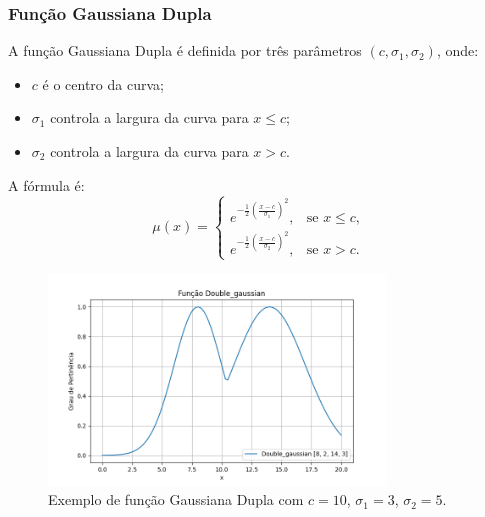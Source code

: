 \documentclass[a4paper,12pt]{article}
\begin{document}
\subsubsection{Função Gaussiana Dupla}
A função Gaussiana Dupla é definida por três parâmetros $(c, \sigma_1, \sigma_2)$, onde:
\begin{itemize}
    \item $c$ é o centro da curva;
    \item $\sigma_1$ controla a largura da curva para $x \leq c$;
    \item $\sigma_2$ controla a largura da curva para $x > c$.
\end{itemize}
A fórmula é:
\[
\mu(x) =
\begin{cases}
e^{-\frac{1}{2} \left( \frac{x - c}{\sigma_1} \right)^2}, & \text{se } x \leq c, \\
e^{-\frac{1}{2} \left( \frac{x - c}{\sigma_2} \right)^2}, & \text{se } x > c.
\end{cases}
\]
\begin{figure}[H]
    \centering
    \includegraphics[width=0.8\textwidth]{img/double_gaussian.png}
    \caption{Exemplo de função Gaussiana Dupla com $c=10$, $\sigma_1=3$, $\sigma_2=5$.}
    \label{fig:funcao_gaussiana_dupla}
\end{figure}
\end{document}

